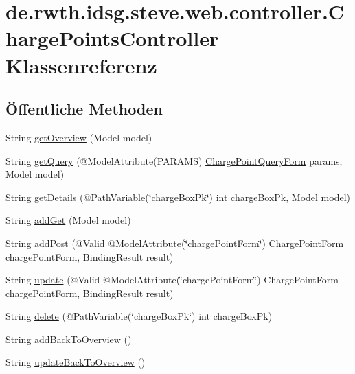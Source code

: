 \hypertarget{classde_1_1rwth_1_1idsg_1_1steve_1_1web_1_1controller_1_1_charge_points_controller}{\section{de.\-rwth.\-idsg.\-steve.\-web.\-controller.\-Charge\-Points\-Controller Klassenreferenz}
\label{classde_1_1rwth_1_1idsg_1_1steve_1_1web_1_1controller_1_1_charge_points_controller}
}
\subsection*{Öffentliche Methoden}
\begin{DoxyCompactItemize}
\item 
String \hyperlink{classde_1_1rwth_1_1idsg_1_1steve_1_1web_1_1controller_1_1_charge_points_controller_a90d7baad526e62cbae767a1f56d56efd}{get\-Overview} (Model model)
\item 
String \hyperlink{classde_1_1rwth_1_1idsg_1_1steve_1_1web_1_1controller_1_1_charge_points_controller_a2798cabb02c1599f7991a53bb322f0a9}{get\-Query} (@Model\-Attribute(P\-A\-R\-A\-M\-S) \hyperlink{classde_1_1rwth_1_1idsg_1_1steve_1_1web_1_1dto_1_1_charge_point_query_form}{Charge\-Point\-Query\-Form} params, Model model)
\item 
String \hyperlink{classde_1_1rwth_1_1idsg_1_1steve_1_1web_1_1controller_1_1_charge_points_controller_a5daf4f0b58f5723d1e80bd334cafdd01}{get\-Details} (@Path\-Variable(\char`\"{}charge\-Box\-Pk\char`\"{}) int charge\-Box\-Pk, Model model)
\item 
String \hyperlink{classde_1_1rwth_1_1idsg_1_1steve_1_1web_1_1controller_1_1_charge_points_controller_a0d833fb3aa6788b29a81263dd71dbb93}{add\-Get} (Model model)
\item 
String \hyperlink{classde_1_1rwth_1_1idsg_1_1steve_1_1web_1_1controller_1_1_charge_points_controller_a409bbb9e851982b4a5dc394589dbf090}{add\-Post} (@Valid @Model\-Attribute(\char`\"{}charge\-Point\-Form\char`\"{}) Charge\-Point\-Form charge\-Point\-Form, Binding\-Result result)
\item 
String \hyperlink{classde_1_1rwth_1_1idsg_1_1steve_1_1web_1_1controller_1_1_charge_points_controller_a6cb60661e842138eacf17fb658afa1c6}{update} (@Valid @Model\-Attribute(\char`\"{}charge\-Point\-Form\char`\"{}) Charge\-Point\-Form charge\-Point\-Form, Binding\-Result result)
\item 
String \hyperlink{classde_1_1rwth_1_1idsg_1_1steve_1_1web_1_1controller_1_1_charge_points_controller_aeb06b1e33a1dc9253937667ed02da19e}{delete} (@Path\-Variable(\char`\"{}charge\-Box\-Pk\char`\"{}) int charge\-Box\-Pk)
\item 
String \hyperlink{classde_1_1rwth_1_1idsg_1_1steve_1_1web_1_1controller_1_1_charge_points_controller_ad0358b9c07f93a7a0b90928b9822fda7}{add\-Back\-To\-Overview} ()
\item 
String \hyperlink{classde_1_1rwth_1_1idsg_1_1steve_1_1web_1_1controller_1_1_charge_points_controller_a20d9b5d7d6d66b7870b7d68195f7556f}{update\-Back\-To\-Overview} ()
\end{DoxyCompactItemize}


